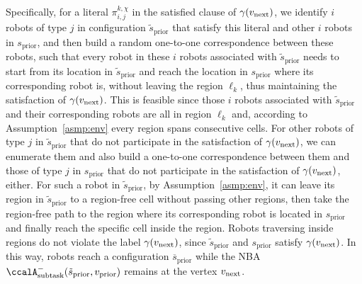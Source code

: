 \documentclass[Afour,sageh,times]{sagej}
\newcommand{\auto}[1]{\ccalA_{\textup{#1}}}
\newcommand{\vertex}[1]{v_{\textup{#1}}}
\renewcommand{\ap}[3]{\mathcal{\pi}_{{#1},{#2}}^{#3}}
\begin{document}
{Specifically, for a literal $\ap{i}{j}{k,\chi}$ in the satisfied clause of $\gamma(\vertex{next})$, we identify $i$ robots of type $j$ in configuration $\tilde{s}_{\text{prior}}$ that satisfy this literal and other $i$ robots in ${s}_{\text{prior}}$, and then build a random one-to-one correspondence between these robots, such that every  robot in these $i$ robots associated with $\tilde{s}_{\text{prior}}$ needs to start from its location in $\tilde{s}_{\text{prior}}$ and reach the location in $s_{\text{prior}}$ where its corresponding robot is, without leaving the region $\ell_k$, thus maintaining the satisfaction of $\gamma(\vertex{next})$. This is feasible since those $i$ robots associated with $\tilde{s}_{\text{prior}}$ and their corresponding robots are all in region $\ell_k$ and, according to Assumption~\ref{asmp:env} every region spans consecutive cells. For other robots of type $j$ in $\tilde{s}_{\text{prior}}$ that do not participate in the satisfaction of $\gamma(\vertex{next})$, we can enumerate them and also build a one-to-one correspondence between them and those of type $j$ in $s_{\text{prior}}$ that do not participate in the satisfaction of $\gamma(\vertex{next})$, either. For such a robot in $\tilde{s}_{\text{prior}}$, by Assumption~\ref{asmp:env}, it can leave its region in $\tilde{s}_\text{prior}$ to a region-free cell without passing other regions, then take the region-free path to the region where its corresponding robot is located in $s_{\text{prior}}$ and finally reach the specific cell inside the region. Robots traversing inside  regions  do not violate the label $\gamma(\vertex{next})$, since $\tilde{s}_{\text{prior}}$ and $s_{\text{prior}}$ satisfy $\gamma(\vertex{next})$. In this way, robots reach a configuration $\overline{s}_{\text{prior}}$ while the NBA $\auto{subtask}^-( \tilde{s}_{\text{prior}},  {v}_{\text{prior}})$ remains at the vertex $\vertex{next}$.

}
\end{document}
